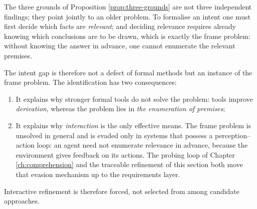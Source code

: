 \begin{remark}\label{rmk:frame}
The three grounds of Proposition \ref{prop:three-grounds} are not three independent
findings; they point jointly to an older problem. To formalise an intent one must first
decide which facts are \emph{relevant}; and deciding relevance requires already knowing
which conclusions are to be drawn, which is exactly the frame problem: without knowing the
answer in advance, one cannot enumerate the relevant premises.

The intent gap is therefore not a defect of formal methods but an instance of the frame
problem. The identification has two consequences:
\begin{enumerate}[label=(\alph*)]
\item It explains why stronger formal tools do not solve the problem: tools improve
      \emph{derivation}, whereas the problem lies in \emph{the enumeration of premises};
\item It explains why \emph{interaction} is the only effective means. The frame problem is
      unsolved in general and is evaded only in systems that possess a perception--action
      loop: an agent need not enumerate relevance in advance, because the environment gives
      feedback on its actions. The probing loop of Chapter \ref{ch:comprehension} and the
      traceable refinement of this section both move that evasion mechanism up to the
      requirements layer.
\end{enumerate}
Interactive refinement is therefore forced, not selected from among candidate approaches.
\end{remark}

